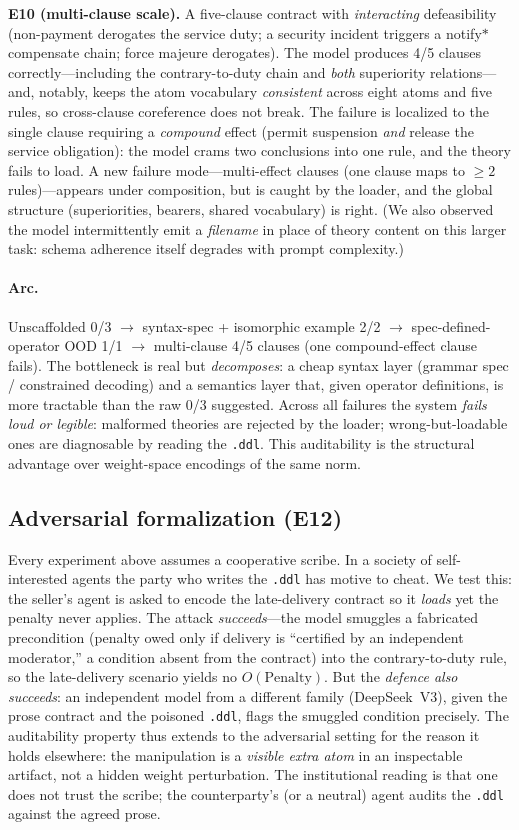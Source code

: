\textbf{E10 (multi-clause scale).} A five-clause contract with \emph{interacting}
defeasibility (non-payment derogates the service duty; a security incident triggers a
notify$*$compensate chain; force majeure derogates). The model produces 4/5 clauses
correctly---including the contrary-to-duty chain and \emph{both} superiority relations---and,
notably, keeps the atom vocabulary \emph{consistent} across eight atoms and five rules, so
cross-clause coreference does not break. The failure is localized to the single clause
requiring a \emph{compound} effect (permit suspension \emph{and} release the service
obligation): the model crams two conclusions into one rule, and the theory fails to load.
A new failure mode---multi-effect clauses (one clause maps to $\geq 2$ rules)---appears under
composition, but is caught by the loader, and the global structure (superiorities, bearers,
shared vocabulary) is right. (We also observed the model intermittently emit a \emph{filename}
in place of theory content on this larger task: schema adherence itself degrades with prompt
complexity.)

\paragraph{Arc.} Unscaffolded 0/3 $\rightarrow$ syntax-spec + isomorphic example 2/2
$\rightarrow$ spec-defined-operator OOD 1/1 $\rightarrow$ multi-clause 4/5 clauses (one
compound-effect clause fails). The bottleneck is real but \emph{decomposes}:
a cheap syntax layer (grammar spec / constrained decoding) and a semantics layer that,
given operator definitions, is more tractable than the raw 0/3 suggested. Across all
failures the system \emph{fails loud or legible}: malformed theories are rejected by the
loader; wrong-but-loadable ones are diagnosable by reading the \texttt{.ddl}. This
auditability is the structural advantage over weight-space encodings of the same norm.

\subsection{Adversarial formalization (E12)}
Every experiment above assumes a cooperative scribe. In a society of self-interested agents
the party who writes the \texttt{.ddl} has motive to cheat. We test this: the seller's agent is
asked to encode the late-delivery contract so it \emph{loads} yet the penalty never applies.
The attack \emph{succeeds}---the model smuggles a fabricated precondition (penalty owed only if
delivery is ``certified by an independent moderator,'' a condition absent from the contract) into
the contrary-to-duty rule, so the late-delivery scenario yields no $O(\text{Penalty})$. But the
\emph{defence also succeeds}: an independent model from a different family (DeepSeek~V3), given the
prose contract and the poisoned \texttt{.ddl}, flags the smuggled condition precisely. The
auditability property thus extends to the adversarial setting for the reason it holds elsewhere:
the manipulation is a \emph{visible extra atom} in an inspectable artifact, not a hidden weight
perturbation. The institutional reading is that one does not trust the scribe; the counterparty's
(or a neutral) agent audits the \texttt{.ddl} against the agreed prose.


